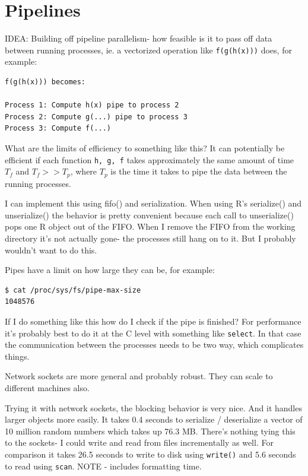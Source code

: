 \documentclass[12pt]{article}
\begin{document}
\section{Pipelines}

IDEA: Building off pipeline parallelism- how feasible is it to pass off
data between running processes, ie. a vectorized operation like
\texttt{f(g(h(x)))} does, for example:

\begin{verbatim}
f(g(h(x))) becomes:

Process 1: Compute h(x) pipe to process 2
Process 2: Compute g(...) pipe to process 3
Process 3: Compute f(...)
\end{verbatim}

What are the limits of efficiency to something like this? It can
potentially be
efficient if each function \texttt{h, g, f} takes approximately the same
amount of time $T_f$ and $T_f >> T_p$, where $T_p$ is the time it takes to
pipe the data between the running processes. 

I can implement this using fifo() and serialization. When using R's
serialize() and unserialize() the behavior is pretty convenient because
each call to unserialize() pops one R object out of the FIFO.
When I remove the FIFO from the working directory it's not actually gone-
the processes still hang on to it. But I probably wouldn't want to do this.

Pipes have a limit on how large they can be, for example:
\begin{verbatim}
$ cat /proc/sys/fs/pipe-max-size
1048576
\end{verbatim}

If I do something like this how do I check if the pipe is finished?
For performance it's probably best to do it at the C level with something
like \texttt{select}. In that case the communication between the processes
needs to be two way, which complicates things.

Network sockets are more general and probably robust. They can scale to
different machines also.

Trying it with network sockets, the blocking behavior is very nice. And it
handles larger objects more easily. It takes 0.4 seconds to serialize /
deserialize a vector of 10 million random numbers which takes up 76.3 MB.
There's nothing tying this to the sockets- I could write and read from
files incrementally as well.  For comparison it takes 26.5 seconds to write
to disk using \texttt{write()} and 5.6 seconds to read using \texttt{scan}.
NOTE - includes formatting time.
\end{document}
